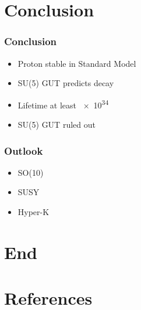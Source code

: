 \documentclass[english, fleqn]{beamer}
\begin{document}
\section*{Conclusion}

\begin{frame}
    \frametitle{Conclusion}

    \begin{itemize}
        \item Proton stable in Standard Model
        \item SU(5) GUT predicts decay
        \item Lifetime at least \SI{e34}{\year} \parencite{super-k/proton_decay}
        \item SU(5) GUT ruled out
    \end{itemize}
\end{frame}

\begin{frame}
    \frametitle{Outlook}

    \begin{itemize}
        \item SO(10)
        \item SUSY
        \item Hyper-K
    \end{itemize}
\end{frame}


\section*{End}

\begin{frame}
    \titlepage
\end{frame}

\nocite{tikz-feynman}

\section*{References}

\begin{frame}[allowframebreaks]

    \printbibliography
\end{frame}
\end{document}
